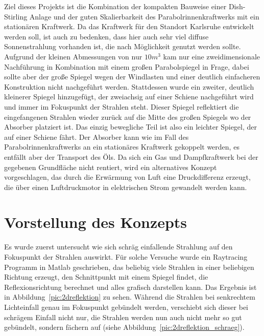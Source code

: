 \documentclass[fontsize=10pt,paper=a4,bibliography=totoc]{scrartcl}
\begin{document}
Ziel dieses Projekts ist die Kombination der kompakten Bauweise einer Dish-Stirling Anlage und der guten Skalierbarkeit des Parabolrinnenkraftwerks mit ein stationären Kraftwerk. Da das Kraftwerk für den Standort Karlsruhe entwickelt werden soll, ist auch zu bedenken, dass hier auch sehr viel diffuse Sonnenstrahlung vorhanden ist, die nach Möglichkeit genutzt werden sollte. Aufgrund der kleinen Abmessungen von nur $10\unit{m}^3$ kam nur eine zweidimensionale Nachführung in Kombination mit einem großen Parabolspiegel in Frage, dabei sollte aber der große Spiegel wegen der Windlasten und einer deutlich einfacheren Konstruktion nicht nachgeführt werden. Stattdessen wurde ein zweiter, deutlich kleinerer Spiegel hinzugefügt, der zweiachsig auf einer Schiene nachgeführt wird und immer im Fokuspunkt der Strahlen steht. Dieser Spiegel reflektiert die eingefangenen Strahlen wieder zurück auf die Mitte des großen Spiegels wo der Absorber platziert ist. Das einzig bewegliche Teil ist also ein leichter Spiegel, der auf einer Schiene fährt. Der Absorber kann wie im Fall des Parabolrinnenkraftwerks an ein stationäres Kraftwerk gekoppelt werden, es entfällt aber der Transport des Öls. Da sich ein Gas und Dampfkraftwerk bei der gegebenen Grundfläche nicht rentiert, wird ein alternatives Konzept vorgeschlagen, das durch die Erwärmung von Luft eine Druckdifferenz erzeugt, die über einen Luftdruckmotor in elektrischen Strom gewandelt werden kann.


\section{Vorstellung des Konzepts}
Es wurde zuerst untersucht wie sich schräg einfallende Strahlung auf den Fokuspunkt der Strahlen auswirkt. Für solche Versuche wurde ein Raytracing Programm in Matlab geschrieben, das beliebig viele Strahlen in einer beliebigen Richtung erzeugt, den Schnittpunkt mit einem Spiegel findet, die Reflexionsrichtung berechnet und alles grafisch darstellen kann. Das Ergebnis ist in Abbildung~\ref{pic:2dreflektion} zu sehen. Während die Strahlen bei senkrechtem Lichteinfall genau im Fokuspunkt gebündelt werden, verschiebt sich dieser
bei schrägem Einfall%
nicht nur, die Strahlen werden nun auch nicht mehr so gut gebündelt, sondern fächern auf (siehe Abbildung~\ref{pic:2dreflektion_schraeg}). 
\end{document}
